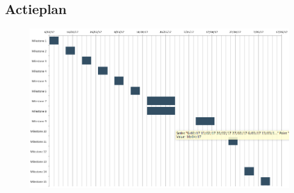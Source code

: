 
\begin{landscape}
	\chapter{\textbf{Actieplan}}
	\vspace{-3.5cm}
	\begin{figure}[H]
		\centering
		\includegraphics[width=1.5\textwidth]{Figuren/GanttChartDark.png}
	\end{figure}
\end{landscape}